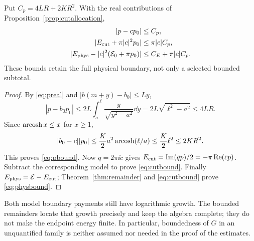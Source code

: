 \begin{theorem}\label{thm:payment}
Put $C_p=4LR+2KR^2$. With the real contributions of
Proposition~\ref{prop:cutallocation},
\begin{align}
 |p-cp_0|&\le C_p,\label{eq:pbound}\\
 |E_{\mathrm{cut}}+\pi|c|^2p_0|&\le\pi|c|C_p,\label{eq:cutbound}\\
 |E_{\mathrm{phys}}-|c|^2(\mathcal E_0+\pi p_0)|&\le C_E+\pi|c|C_p.
 \label{eq:physbound}
\end{align}
These bounds retain the full physical boundary, not only a selected
bounded subtotal.
\end{theorem}
\begin{proof}
By \eqref{eq:preal} and $|b(m+y)-b_0|\le Ly$,
\[
 |p-b_0p_0|\le2L\int_a^\ell\frac{y}{\sqrt{y^2-a^2}}\dd y
 =2L\sqrt{\ell^2-a^2}\le4LR.
\]
Since $\operatorname{arcosh} x\le x$ for $x\ge1$,
\[
 |b_0-c||p_0|\le\frac K2a^2\operatorname{arcosh}(\ell/a)
 \le\frac K2\ell^2\le2KR^2.
\]
This proves \eqref{eq:pbound}. Now $q=2\pi\ii c$ gives
$E_{\mathrm{cut}}=\operatorname{Im}(\bar q p)/2=-\pi\operatorname{Re}(\bar c p)$.
Subtract the corresponding model to prove \eqref{eq:cutbound}.
Finally $E_{\mathrm{phys}}=\mathcal E-E_{\mathrm{cut}}$; Theorem~\ref{thm:remainder} and
\eqref{eq:cutbound} prove \eqref{eq:physbound}.
\end{proof}

Both model boundary payments still have logarithmic growth. The bounded
remainders locate that growth precisely and keep the algebra complete;
they do not make the endpoint energy finite. In particular, boundedness
of $G$ in an unquantified family is neither assumed nor needed in the
proof of the estimates.
